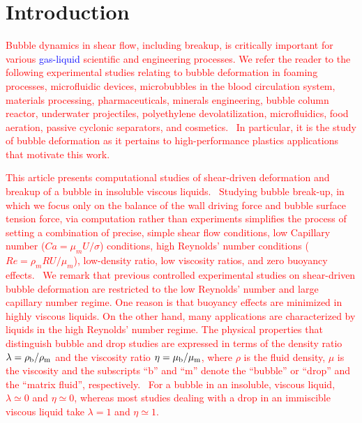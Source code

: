 \documentclass{elsarticle}
\begin{document}
\linenumbers
\section{Introduction}

%
%
\textcolor{red} {
Bubble dynamics in shear flow, including breakup, is critically important for various \textcolor{blue} {gas-liquid} scientific and engineering processes.  We refer the reader to the following experimental studies relating to bubble deformation in foaming processes, microfluidic devices, microbubbles in the blood circulation system, materials processing, pharmaceuticals, minerals engineering, bubble column reactor, underwater projectiles, polyethylene devolatilization, microfluidics, food aeration, passive cyclonic separators, and cosmetics\cite{ChuFinBouAtaHamPug19,MulTobDreFisWin08,BenRodFauPinFerPerGarMirLim18,DreSai15,EFTEKHARI2021837,WANG2023108105,doi:10.1021/acs.langmuir.1c01814,yoshikawa2010bubble,CanedoETAL,GAO2022103212,WONG2012417,PolyethyleneDevo,FRENSE2024120579,lohse2018bubble,schluter2021small,SANOGO2023112478,hoyt2013performance,sines2020study}.  In particular, it is the study of bubble deformation as it pertains to high-performance plastics applications that motivate this work.
}
\par
\textcolor{red} {
	This article presents computational studies of shear-driven deformation and breakup of a bubble in insoluble viscous liquids.  Studying bubble break-up, in which we focus only on the balance of the wall driving force and bubble surface tension force, via computation rather than experiments simplifies the process of setting a combination of precise, simple shear flow conditions, low Capillary number ($Ca=\mu_{m}U/\sigma$) conditions, high Reynolds' number conditions ($Re=\rho_{m} R U/\mu_{m}$), low-density ratio, low viscosity ratios, and zero buoyancy effects.  We remark that previous controlled experimental studies on shear-driven bubble deformation are restricted to the low Reynolds' number and large capillary number regime\cite{RusMan02,CanedoETAL}.  One reason is that buoyancy effects are minimized in highly viscous liquids.  On the other hand, many applications are characterized by liquids in the high Reynolds' number regime.  The physical properties that distinguish bubble and drop studies are expressed in terms of the density ratio $\lambda = \rho_{\rm b} / \rho_{\rm m}$ and the viscosity ratio $\eta = \mu_{\rm b} / \mu_{\rm m}$, where $\rho$ is the fluid density, $\mu$ is the viscosity and the subscripts ``b'' and ``m'' denote the ``bubble'' or ``drop'' and the ``matrix fluid'', respectively.  For a bubble in an insoluble, viscous liquid, $\lambda \simeq 0$ and $\eta \simeq 0$, whereas most studies dealing with a drop in an immiscible viscous liquid take $\lambda =1$ and $\eta \simeq 1$.  
}
\end{document}
